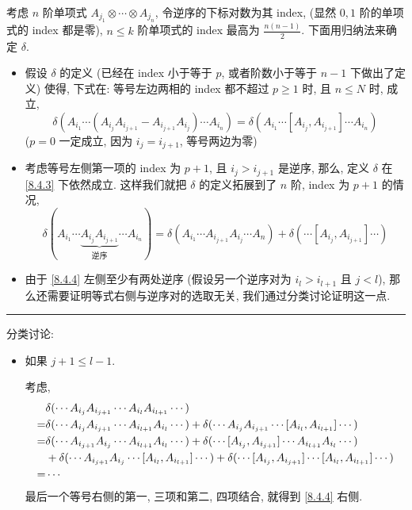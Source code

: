 \begin{itemize}
\begin{tcolorbox}[title=proof:]
		考虑 $n$ 阶单项式 $A_{j_1} \otimes \cdots \otimes A_{j_n}$, 令逆序的下标对数为其 index, (显然 $0, 1$ 阶的单项式的 index 都是零), $n \leq k$ 阶单项式的 index 最高为 $\frac{n (n - 1)}{2}$. 下面用归纳法来确定 $\delta$.
		\begin{itemize}
			\item 假设 $\delta$ 的定义 (已经在 index 小于等于 $p$, 或者阶数小于等于 $n - 1$ 下做出了定义) 使得, 下式在: 等号左边两相的 index 都不超过 $p \geq 1$ 时, 且 $n \leq N$ 时, 成立,
			\begin{equation} \label{8.4.3}
				\delta(A_{i_1} \cdots (A_{i_j} A_{i_{j + 1}} - A_{i_{j + 1}} A_{i_j}) \cdots A_{i_n}) = \delta(A_{i_1} \cdots [A_{i_j}, A_{i_{j + 1}}] \cdots A_{i_n})
			\end{equation}
			($p = 0$ 一定成立, 因为 $i_j = i_{j + 1}$, 等号两边为零)
			
			\item 考虑等号左侧第一项的 index 为 $p + 1$, 且 $i_j > i_{j + 1}$ 是逆序, 那么, 定义 $\delta$ 在 \eqref{8.4.3} 下依然成立. 这样我们就把 $\delta$ 的定义拓展到了 $n$ 阶, index 为 $p + 1$ 的情况,
			\begin{equation} \label{8.4.4}
				\delta(A_{i_1} \cdots \underbrace{A_{i_j} A_{i_{j + 1}}}_{\text{逆序}} \cdots A_{i_n}) = \delta(A_{i_1} \cdots A_{i_{j + 1}} A_{i_j} \cdots A_n) + \delta(\cdots [A_{i_j}, A_{i_{j + 1}}] \cdots)
			\end{equation}
			
			\item 由于 \eqref{8.4.4} 左侧至少有两处逆序 (假设另一个逆序对为 $i_l > i_{l + 1}$ 且 $j < l$), 那么还需要证明等式右侧与逆序对的选取无关, 我们通过分类讨论证明这一点.
		\end{itemize}
		
		\noindent\rule[0.5ex]{\linewidth}{0.5pt} %
		
		分类讨论:
		\begin{itemize}
			\item 如果 $j + 1 \leq l - 1$.
			
			考虑,
			\begin{align}
				& \delta(\cdots A_{i_j} A_{i_{j + 1}} \cdots A_{i_l} A_{i_{l + 1}} \cdots) \notag \\
				=& \delta(\cdots A_{i_j} A_{i_{j + 1}} \cdots A_{i_{l + 1}} A_{i_l} \cdots) + \delta(\cdots A_{i_j} A_{i_{j + 1}} \cdots [A_{i_l}, A_{i_{l + 1}}] \cdots) \notag \\
				=& \delta(\cdots A_{i_{j + 1}} A_{i_j} \cdots A_{i_{l + 1}} A_{i_l} \cdots) + \delta(\cdots [A_{i_j}, A_{i_{j + 1}}] \cdots A_{i_{l + 1}} A_{i_l} \cdots) \notag \\
				& + \delta(\cdots A_{i_{j + 1}} A_{i_j} \cdots [A_{i_l}, A_{i_{l + 1}}] \cdots) + \delta(\cdots [A_{i_j}, A_{i_{j + 1}}] \cdots [A_{i_l}, A_{i_{l + 1}}] \cdots) \notag \\
				=& \cdots
			\end{align}
			最后一个等号右侧的第一, 三项和第二, 四项结合, 就得到 \eqref{8.4.4} 右侧.
			

\end{itemize}
\end{tcolorbox}
\end{itemize}

